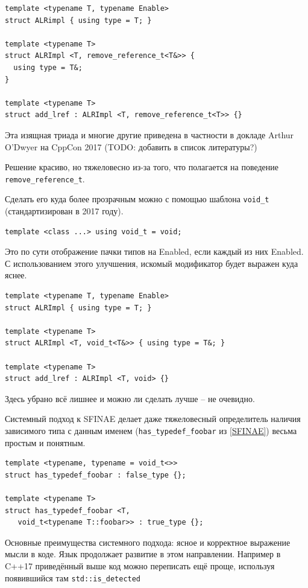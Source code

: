 \documentclass[a4paper,12pt,oneside]{article}
\begin{document}
\begin{lstlisting}
template <typename T, typename Enable> 
struct ALRimpl { using type = T; }

template <typename T> 
struct ALRImpl <T, remove_reference_t<T&>> { 
  using type = T&; 
}

template <typename T> 
struct add_lref : ALRImpl <T, remove_reference_t<T>> {}
\end{lstlisting}

Эта изящная триада и многие другие приведена в частности в докладе Arthur O'Dwyer на CppCon 2017 (TODO: добавить в список литературы?)

Решение красиво, но тяжеловесно из-за того, что полагается на поведение \lstinline!remove_reference_t!.

Сделать его куда более прозрачным можно с помощью шаблона \lstinline!void_t! (стандартизирован в 2017 году).

\begin{lstlisting}
template <class ...> using void_t = void;
\end{lstlisting}

Это по сути отображение пачки типов на Enabled, если каждый из них Enabled. С использованием этого улучшения, искомый модификатор будет выражен куда яснее.

\begin{lstlisting}
template <typename T, typename Enable> 
struct ALRImpl { using type = T; }

template <typename T> 
struct ALRImpl <T, void_t<T&>> { using type = T&; }

template <typename T> 
struct add_lref : ALRImpl <T, void> {}
\end{lstlisting}
 
Здесь убрано всё лишнее и можно ли сделать лучше -- не очевидно.

Системный подход к SFINAE делает даже тяжеловесный определитель наличия зависимого типа с данным именем (\lstinline!has_typedef_foobar! из \ref{SFINAE}) весьма простым и понятным.

\begin{lstlisting}
template <typename, typename = void_t<>>
struct has_typedef_foobar : false_type {};

template <typename T> 
struct has_typedef_foobar <T, 
   void_t<typename T::foobar>> : true_type {};
\end{lstlisting}

Основные преимущества системного подхода: ясное и корректное выражение мысли в коде. Язык продолжает развитие в этом направлении. Например в C++17 приведённый выше код можно переписать ещё проще, используя появившийся там \lstinline!std::is_detected!
\end{document}
